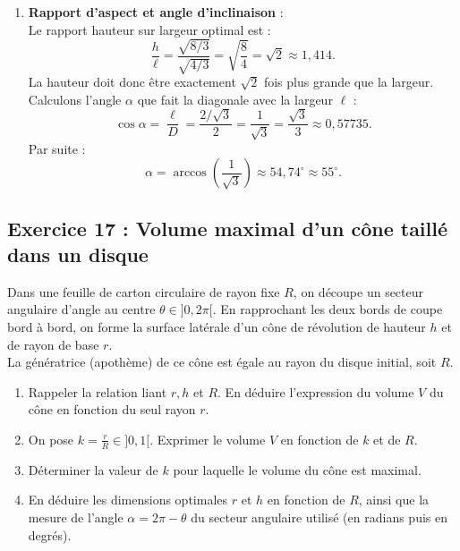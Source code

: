 \documentclass[11pt,a4paper]{article}
\begin{document}
\begin{correctionbox}
\begin{enumerate}[label=\textbf{\arabic*.}]
    \item \textbf{Rapport d'aspect et angle d'inclinaison} :\\
    Le rapport hauteur sur largeur optimal est :
    \[
    \frac{h}{\ell} = \frac{\sqrt{8/3}}{\sqrt{4/3}} = \sqrt{\frac{8}{4}} = \sqrt{2} \approx 1{,}414.
    \]
    La hauteur doit donc être exactement $\sqrt{2}$ fois plus grande que la largeur.\\
    Calculons l'angle $\alpha$ que fait la diagonale avec la largeur $\ell$ :
    \[
    \cos \alpha = \frac{\ell}{D} = \frac{2/\sqrt{3}}{2} = \frac{1}{\sqrt{3}} = \frac{\sqrt{3}}{3} \approx 0{,}57735.
    \]
    Par suite :
    \[
    \alpha = \arccos\left(\frac{1}{\sqrt{3}}\right) \approx 54{,}74^\circ \approx 55^\circ.
    \]
\end{enumerate}
\end{correctionbox}

\subsection*{Exercice 17 : Volume maximal d'un cône taillé dans un disque}

Dans une feuille de carton circulaire de rayon fixe $R$, on découpe un secteur angulaire d'angle au centre $\theta \in ]0, 2\pi[$. En rapprochant les deux bords de coupe bord à bord, on forme la surface latérale d'un cône de révolution de hauteur $h$ et de rayon de base $r$.\\
La génératrice (apothème) de ce cône est égale au rayon du disque initial, soit $R$.
\begin{enumerate}[label=\textbf{\arabic*.}]
    \item Rappeler la relation liant $r, h$ et $R$. En déduire l'expression du volume $V$ du cône en fonction du seul rayon $r$.
    \item On pose $k = \frac{r}{R} \in ]0, 1[$. Exprimer le volume $V$ en fonction de $k$ et de $R$.
    \item Déterminer la valeur de $k$ pour laquelle le volume du cône est maximal.
    \item En déduire les dimensions optimales $r$ et $h$ en fonction de $R$, ainsi que la mesure de l'angle $\alpha = 2\pi - \theta$ du secteur angulaire utilisé (en radians puis en degrés).
\end{enumerate}
\end{document}
